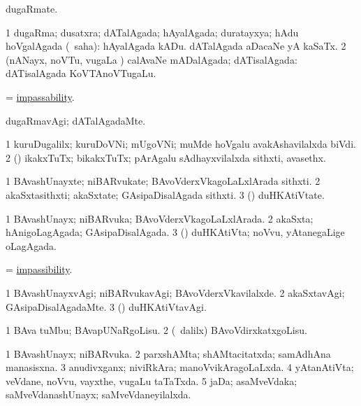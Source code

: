 \bentry
{}
\gl{\nA}
\bmng
dugaRmate. 
\emng
\eentry

\bentry
{}
\gl{\gu}
\bmng
\bnum
\num{1} dugaRma; dusatxra; dATalAgada; hAyalAgada; duratayxya; hAdu hoVgalAgada (\rUpa\ saha):  hAyalAgada kADu.  dATalAgada aDacaNe yA kaSaTx. 
\num{2} (nANayx, noVTu, \mo vugaLa \vi) calAvaNe mADalAgada; dATisalAgada:  dATisalAgada KoVTAnoVTugaLu. 
\enum
\emng
\eentry

\bentry
{}
\gl{\nA}
\bmng
 = \hyperlink{impassability}{impassability}. 
\emng
\eentry

\bentry
{}
\gl{\kirxvi}
\bmng
dugaRmavAgi; dATalAgadaMte. 
\emng
\eentry

\bentry
{}
\gl{\nA}
\bmng
\bnum
\num{1} kuruDugalilx; kuruDoVNi; mUgoVNi; muMde hoVgalu avakAshavilalxda biVdi. 
\num{2} (\rUpa) ikakxTuTx; bikakxTuTx; pArAgalu sAdhayxvilalxda sithxti, avasethx. 
\enum
\emng
\eentry

\bentry
{}
\gl{\nA}
\bmng
\bnum
\num{1} BAvashUnayxte; niBARvukate; BAvoVderxVkagoLaLxlArada sithxti. 
\num{2} akaSxtasithxti; akaSxtate; GAsipaDisalAgada sithxti. 
\num{3} (\deVva) duHKAtiVtate. 
\enum
\emng
\eentry

\bentry
{}
\gl{\gu}
\bmng
\bnum
\num{1} BAvashUnayx; niBARvuka; BAvoVderxVkagoLaLxlArada. 
\num{2} akaSxta; hAnigoLagAgada; GAsipaDisalAgada. 
\num{3} (\deVva) duHKAtiVta; noVvu, yAtanegaLige oLagAgada. 
\enum
\emng
\eentry

\bentry
{}
\gl{\nA}
\bmng
 = \hyperlink{impassibility}{impassibility}. 
\emng
\eentry

\bentry
{}
\gl{\kirxvi}
\bmng
\bnum
\num{1} BAvashUnayxvAgi; niBARvukavAgi; BAvoVderxVkavilalxde. 
\num{2} akaSxtavAgi; GAsipaDisalAgadaMte. 
\num{3} (\deVva) duHKAtiVtavAgi. 
\enum
\emng
\eentry

\bentry
{}
\gl{\sakirx}
\bmng
\bnum
\num{1} BAva tuMbu; BAvapUNaRgoLisu. 
\num{2} (\kanmu\ \BUkaq dalilx) BAvoVdirxkatxgoLisu. 
\enum
\emng
\eentry

\bentry
{}
\gl{\gu}
\bmng
\bnum
\num{1} BAvashUnayx; niBARvuka. 
\num{2} parxshAMta; shAMtacitatxda; samAdhAna manasisxna. 
\num{3} anudivxganx; niviRkAra; manoVvikAragoLaLxda. 
\num{4} yAtanAtiVta; veVdane, noVvu, vayxthe, \mo vugaLu taTaTxda. 
\num{5} jaDa; asaMveVdaka; saMveVdanashUnayx; saMveVdaneyilalxda. 
\enum
\emng
\eentry

